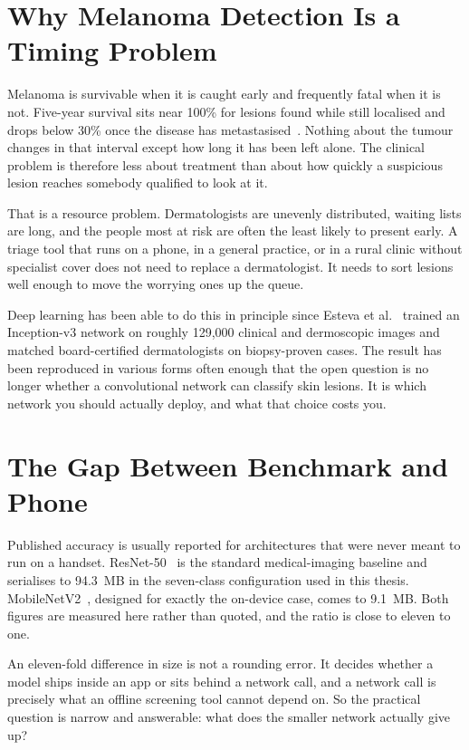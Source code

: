 \section{Why Melanoma Detection Is a Timing Problem}

Melanoma is survivable when it is caught early and frequently fatal when it is not.
Five-year survival sits near 100\% for lesions found while still localised and drops
below 30\% once the disease has metastasised~\cite{esteva2017dermatologist}. Nothing
about the tumour changes in that interval except how long it has been left alone. The
clinical problem is therefore less about treatment than about how quickly a suspicious
lesion reaches somebody qualified to look at it.

That is a resource problem. Dermatologists are unevenly distributed, waiting lists are
long, and the people most at risk are often the least likely to present early. A triage
tool that runs on a phone, in a general practice, or in a rural clinic without
specialist cover does not need to replace a dermatologist. It needs to sort lesions well
enough to move the worrying ones up the queue.

Deep learning has been able to do this in principle since Esteva et
al.~\cite{esteva2017dermatologist} trained an Inception-v3 network on roughly 129{,}000
clinical and dermoscopic images and matched board-certified dermatologists on biopsy-proven
cases. The result has been reproduced in various forms often enough that the open
question is no longer whether a convolutional network can classify skin lesions. It is
which network you should actually deploy, and what that choice costs you.

\section{The Gap Between Benchmark and Phone}

Published accuracy is usually reported for architectures that were never meant to run
on a handset. ResNet-50~\cite{he2016resnet} is the standard medical-imaging baseline and
serialises to 94.3~MB in the seven-class configuration used in this thesis.
MobileNetV2~\cite{sandler2018mobilenetv2}, designed for exactly the on-device case,
comes to 9.1~MB. Both figures are measured here rather than quoted, and the ratio is
close to eleven to one.

An eleven-fold difference in size is not a rounding error. It decides whether a model
ships inside an app or sits behind a network call, and a network call is precisely what
an offline screening tool cannot depend on. So the practical question is narrow and
answerable: what does the smaller network actually give up?


